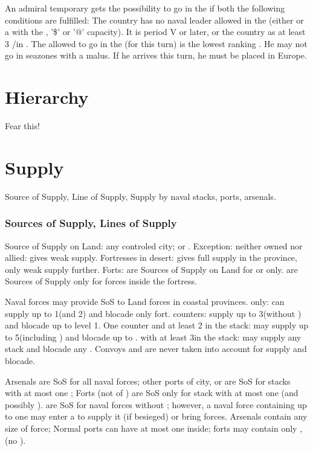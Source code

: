 An admiral temporary gets the possibility to go in the  if
both the following conditions are fulfilled:
\bparag The country has no naval leader allowed in the \ROTW (either \LeaderE
or a \LeaderA with the \ROTW, '\$' or '@' capacity).
\bparag It is period V or later, or the country as at least 3 \COL/\TP in
.
\bparag The \LeaderA allowed to go in the  (for this turn) is
the lowest ranking \LeaderA. He may not go in seazones with a malus. If he
arrives this turn, he must be placed in Europe.

\section{Hierarchy}
Fear this!

\section{Supply}
Source of Supply, Line of Supply, Supply by naval stacks, ports, arsenals.

\subsubsection{Sources of Supply, Lines of Supply}

\bparag Source of Supply on Land: any controled city; \TP or \COL.  Exception:
neither owned nor allied: gives weak supply.  Fortresses in desert: gives full
supply in the province, only weak supply further.
\bparag Forts: are Sources of Supply on Land for \LD or \LDE only.
\bparag \Presidios are Sources of Supply only for forces inside the fortress.

Naval forces may provide SoS to Land forces in coastal provinces.
\bparag \de only: can supply up to 1\LD (and 2\LDE) and blocade only fort.
\bparag \ND counters: supply up to 3\LD (without \ARMY) and blocade up to
\fortress level 1.
\bparag One \FLEET counter and at least 2 \ND in the stack: may supply up to
5\LD (including \ARMY) and blocade up to .
\bparag \FLEET\faceplus with at least 3\ND in the stack: may supply any stack
and blocade any \fortress.
\bparag Convoys and are never taken into account for supply and blocade.

Arsenals are SoS for all naval forces; other ports of city, \COL or \TP are
SoS for stacks with at most one \FLEET;
\bparag Forts (not of \TP) are SoS only for stack with at most one \ND
(and possibly \NDE).
\bparag \Presidios are SoS for naval forces without \FLEET;
however, a naval force containing up to one \FLEET may enter a
\Presidio to supply it (if besieged) or bring forces.
\bparag[Stacking:] Arsenals contain any size of force;
Normal ports can have at most one \FLEET inside;
forts may contain only \ND, \NDE (no \FLEET).

